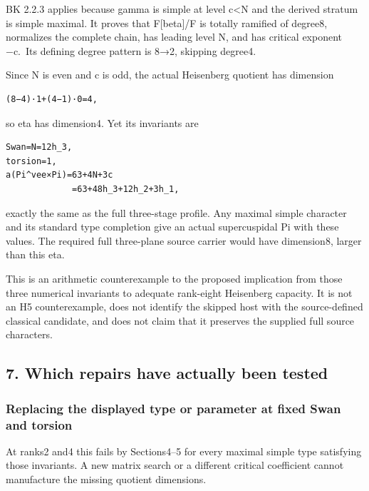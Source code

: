 BK 2.2.3 applies because gamma is simple at level c\textless N and the
derived stratum is simple maximal. It proves that F{[}beta{]}/F is
totally ramified of degree8, normalizes the complete chain, has leading
level N, and has critical exponent −c.~Its defining degree pattern is
8→2, skipping degree4.

Since N is even and c is odd, the actual Heisenberg quotient has
dimension

\begin{Verbatim}[fontsize=\small,breaklines=true,breakanywhere=true]
(8−4)·1+(4−1)·0=4,
\end{Verbatim}

so eta has dimension4. Yet its invariants are

\begin{Verbatim}[fontsize=\small,breaklines=true,breakanywhere=true]
Swan=N=12h_3,
torsion=1,
a(Pi^vee×Pi)=63+4N+3c
             =63+48h_3+12h_2+3h_1,
\end{Verbatim}

exactly the same as the full three-stage profile. Any maximal simple
character and its standard type completion give an actual supercuspidal
Pi with these values. The required full three-plane source carrier would
have dimension8, larger than this eta.

This is an arithmetic counterexample to the proposed implication from
those three numerical invariants to adequate rank-eight Heisenberg
capacity. It is not an H5 counterexample, does not identify the skipped
host with the source-defined classical candidate, and does not claim
that it preserves the supplied full source characters.

\hypertarget{dyadic_capacity-which-repairs-have-actually-been-tested}{%
\subsection{7. Which repairs have actually been
tested}\label{dyadic_capacity-which-repairs-have-actually-been-tested}}

\hypertarget{dyadic_capacity-replacing-the-displayed-type-or-parameter-at-fixed-swan-and-torsion}{%
\subsubsection{Replacing the displayed type or parameter at fixed Swan
and
torsion}\label{dyadic_capacity-replacing-the-displayed-type-or-parameter-at-fixed-swan-and-torsion}}

At ranks2 and4 this fails by Sections4--5 for every maximal simple type
satisfying those invariants. A new matrix search or a different critical
coefficient cannot manufacture the missing quotient dimensions.

